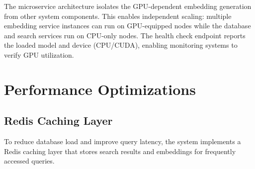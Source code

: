 The microservice architecture isolates the GPU-dependent embedding generation from other system components. This enables independent scaling: multiple embedding service instances can run on GPU-equipped nodes while the database and search services run on CPU-only nodes. The health check endpoint reports the loaded model and device (CPU/CUDA), enabling monitoring systems to verify GPU utilization.

\clearpage

\section{Performance Optimizations}

\subsection{Redis Caching Layer}

To reduce database load and improve query latency, the system implements a Redis caching layer that stores search results and embeddings for frequently accessed queries.

